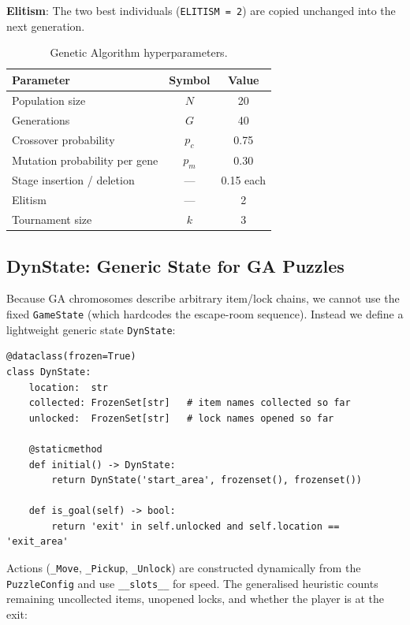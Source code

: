 \documentclass[12pt, a4paper]{report}
\begin{document}
\textbf{Elitism}: The two best individuals (\texttt{ELITISM = 2}) are copied
unchanged into the next generation.

\begin{table}[H]
\centering
\caption{Genetic Algorithm hyperparameters.}
\label{tab:gaparams}
\begin{tabular}{lcc}
\toprule
\textbf{Parameter} & \textbf{Symbol} & \textbf{Value} \\
\midrule
Population size               & $N$     & 20   \\
Generations                   & $G$     & 40   \\
Crossover probability         & $p_c$   & 0.75 \\
Mutation probability per gene & $p_m$   & 0.30 \\
Stage insertion / deletion    & ---     & 0.15 each \\
Elitism                       & ---     & 2    \\
Tournament size               & $k$     & 3    \\
\bottomrule
\end{tabular}
\end{table}

\subsection{DynState: Generic State for GA Puzzles}
\label{sec:dynstate}

Because GA chromosomes describe arbitrary item/lock chains, we cannot use the
fixed \texttt{GameState} (which hardcodes the escape-room sequence).  Instead
we define a lightweight generic state \texttt{DynState}:

\begin{lstlisting}[style=pyStyle,
  caption={\texttt{DynState} class used by the dynamic solver
           (\texttt{ai/dynamic\_solver.py}).},
  label=lst:dynstate]
@dataclass(frozen=True)
class DynState:
    location:  str
    collected: FrozenSet[str]   # item names collected so far
    unlocked:  FrozenSet[str]   # lock names opened so far

    @staticmethod
    def initial() -> DynState:
        return DynState('start_area', frozenset(), frozenset())

    def is_goal(self) -> bool:
        return 'exit' in self.unlocked and self.location == 'exit_area'
\end{lstlisting}

Actions (\texttt{\_Move}, \texttt{\_Pickup}, \texttt{\_Unlock}) are constructed
dynamically from the \texttt{PuzzleConfig} and use \texttt{\_\_slots\_\_} for
speed.  The generalised heuristic counts remaining uncollected items, unopened
locks, and whether the player is at the exit:
\end{document}
